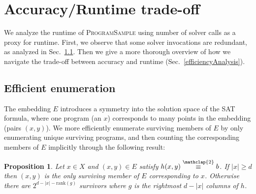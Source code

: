 \documentclass{article}
\newcommand{\theSystem}{\textsc{ProgramSample}}
\newtheorem{proposition}{Proposition}
\newcommand\modt{\stackrel{\mathclap{\normalfont 2}}{\equiv}}
\begin{document}
    
  

  \section{Accuracy/Runtime trade-off}

  
  We analyze the runtime of \theSystem{}
  using number of solver calls as a proxy for runtime.
  First, we observe that some solver invocations are redundant, as analyzed in Sec.~\ref{efficientEnumeration}.
  Then we give a more thorough overview of how we navigate the trade-off between accuracy and runtime  (Sec.~\ref{efficiencyAnalysis}).
  
 
\subsection{Efficient enumeration}\label{efficientEnumeration}
 The embedding $E$ introduces a symmetry into the solution space of the SAT formula, where one program (an $x$) corresponds to many points in the embedding (pairs $(x,y)$).
  We more efficiently enumerate surviving members of $E$ by only enumerating unique surviving programs,
  and then counting the corresponding members of $E$ implicitly through the following result:
  \begin{proposition}\label{ranktheorem}
    Let $x\in X$ and $(x,y)\in E $ satisfy $h(x,y) \modt b$.  If $\lvert x \rvert  \geq d$ then $(x,y)$ is the only surviving member of $E$ corresponding to $x$. Otherwise there are $2^{d - \lvert x \rvert  - \text{rank}(g)}$ survivors where $g$ is the rightmost $d - \lvert x \rvert $ columns of $h$.
  \end{proposition}
\end{document}
